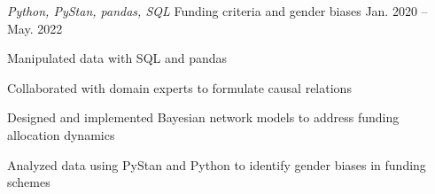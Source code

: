 \begin{cventries}
  \cventry
    {\emph{Python, PyStan, pandas, SQL}} %
    {Funding criteria and gender biases} %
    {} %
    {Jan. 2020 -- May. 2022} %
    {
      \begin{cvitems} %
        \item{Manipulated data with SQL and pandas}
        \item{Collaborated with domain experts to formulate causal relations}
        \item{Designed and implemented Bayesian network models to address funding allocation dynamics}
        \item{Analyzed data using PyStan and Python to identify gender biases in funding schemes}
      \end{cvitems}
    }

\end{cventries}
